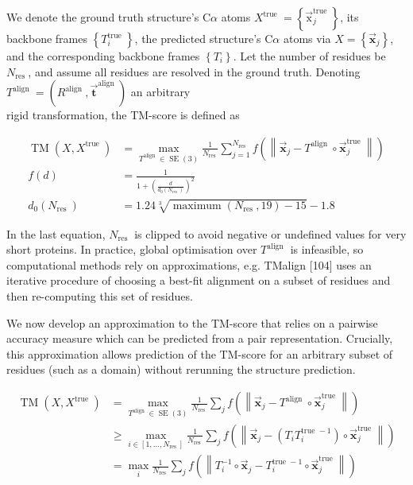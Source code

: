 \documentclass[10pt]{article}
\begin{document}
We denote the ground truth structure's $\mathrm{C} \alpha$ atoms $X^{\text {true }}=\left\{\overrightarrow{\mathrm{x}}_{j}^{\text {true }}\right\}$, its backbone frames $\left\{T_{i}^{\text {true }}\right\}$, the predicted structure's $\mathrm{C} \alpha$ atoms via $X=\left\{\overrightarrow{\mathbf{x}}_{j}\right\}$, and the corresponding backbone frames $\left\{T_{i}\right\}$. Let the number of residues be $N_{\text {res }}$, and assume all residues are resolved in the ground truth. Denoting $T^{\text {align }}=\left(R^{\text {align }}, \overrightarrow{\mathbf{t}}^{\text {align }}\right)$ an arbitrary\\
rigid transformation, the TM-score is defined as


\begin{align*}
\operatorname{TM}\left(X, X^{\text {true }}\right) & =\max _{T^{\text {align }} \in \operatorname{SE}(3)} \frac{1}{N_{\text {res }}} \sum_{j=1}^{N_{\text {res }}} f\left(\left\|\overrightarrow{\mathbf{x}}_{j}-T^{\text {align }} \circ \overrightarrow{\mathbf{x}}_{j}^{\text {true }}\right\|\right)  \tag{31}\\
f(d) & =\frac{1}{1+\left(\frac{d}{d_{0}\left(N_{\text {res }}\right)}\right)^{2}}  \tag{32}\\
d_{0}\left(N_{\text {res }}\right) & =1.24 \sqrt[3]{\operatorname{maximum}\left(N_{\text {res }}, 19\right)-15}-1.8 \tag{33}
\end{align*}


In the last equation, $N_{\text {res }}$ is clipped to avoid negative or undefined values for very short proteins. In practice, global optimisation over $T^{\text {align }}$ is infeasible, so computational methods rely on approximations, e.g. TMalign [104] uses an iterative procedure of choosing a best-fit alignment on a subset of residues and then re-computing this set of residues.

We now develop an approximation to the TM-score that relies on a pairwise accuracy measure which can be predicted from a pair representation. Crucially, this approximation allows prediction of the TM-score for an arbitrary subset of residues (such as a domain) without rerunning the structure prediction.


\begin{align*}
\operatorname{TM}\left(X, X^{\text {true }}\right) & =\max _{T^{\text {align }} \in \operatorname{SE}(3)} \frac{1}{N_{\text {res }}} \sum_{j} f\left(\left\|\overrightarrow{\mathbf{x}}_{j}-T^{\text {align }} \circ \overrightarrow{\mathbf{x}}_{j}^{\text {true }}\right\|\right)  \tag{34}\\
& \geq \max _{i \in\left[1, \ldots, N_{\text {res }}\right]} \frac{1}{N_{\text {res }}} \sum_{j} f\left(\left\|\overrightarrow{\mathbf{x}}_{j}-\left(T_{i} T_{i}^{\text {true }-1}\right) \circ \overrightarrow{\mathbf{x}}_{j}^{\text {true }}\right\|\right)  \tag{35}\\
& =\max _{i} \frac{1}{N_{\text {res }}} \sum_{j} f\left(\left\|T_{i}^{-1} \circ \overrightarrow{\mathbf{x}}_{j}-T_{i}^{\text {true }-1} \circ \overrightarrow{\mathbf{x}}_{j}^{\text {true }}\right\|\right) \tag{36}
\end{align*}
\end{document}
